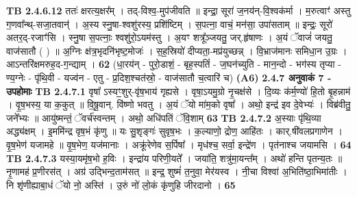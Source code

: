 \documentclass[17pt]{extarticle}
\begin{document}
                  \newline
                                \textbf{ TB 2.4.6.12} \newline
                  ततः॑ क्षरत्य॒क्षर᳚म् । तद्-विश्व॒-मुप॑जीवति ॥ इन्द्रा॒ सूरा॑ ज॒नय॑न्-वि॒श्वक॑र्मा । म॒रुत्वाꣳ॑ अस्तु ग॒णवा᳚न्थ्-सजा॒तवान्॑ । अ॒स्य स्नु॒षा-श्वशु॑रस्य॒ प्रशि॑ष्टिम् । स॒पत्ना॒ वाचं॒ मन॑सा॒ उपा॑सताम् ॥ इन्द्रः॒ सूरो॑ अतर॒द्-रजाꣳ॑सि । स्नु॒षा स॒पत्नाः॒ श्वशु॑रो॒ऽयम॑स्तु । अ॒यꣳ शत्रू᳚ञ्जयतु॒ जर्.हृ॑षाणः । अ॒यं ॅवाजं॑ जयतु॒ वाज॑सातौ ( ) ॥ अ॒ग्निः क्ष॑त्र॒भृदनि॑भृष्ट॒मोजः॑ । स॒ह॒स्रियो॑ दीप्यता॒-मप्र॑युच्छन्न् । वि॒भ्राज॑मानः समिधा॒न उ॒ग्रः । आऽन्तरि॑क्षमरुह॒द-ग॒न्द्याम् । \textbf{ 62} \newline
                  \newline
                                    (धा॒रय॑न् - पुरो॒डाशं॒ - बृह॒स्पतिं॑ - ज॒घन॑च्युति - मान॒न्दो - भग॑स्य तृप्या - ण्य॒ग्नेः - पृ॑थि॒वी - यज्व॑न - एतु - प्र॒दिश॒श्चत॑स्रो॒ - वाज॑सातौ च॒त्वारि॑ च) \textbf{(A6)} \newline \newline
                \textbf{ 2.4.7      अनुवाकं   7 - उपहोमाः} \newline
                                \textbf{ TB 2.4.7.1} \newline
                  वृषा᳚ ऽस्यꣳ॒॒शुर्-वृ॑ष॒भाय॑ गृह्यसे । वृषा॒ऽयमु॒ग्रो नृ॒चक्ष॑से । दि॒व्यः क॑र्म॒ण्यो॑ हि॒तो बृ॒हन्नाम॑ । वृ॒ष॒भस्य॒ या क॒कुत् ॥ वि॒षू॒वान्. वि॑ष्णो भवतु । अ॒यं ॅयो मा॑म॒को वृषा᳚ । अथो॒ इन्द्र॑ इव दे॒वेभ्यः॑ । विब्र॑वीतु॒ जने᳚भ्यः ॥ आयु॑ष्मन्तं॒ ॅवर्च॑स्वन्तम् । अथो॒ अधि॑पतिं ॅवि॒शाम् \textbf{ 63} \newline
                  \newline
                                \textbf{ TB 2.4.7.2} \newline
                  अ॒स्याः पृ॑थि॒व्या अद्ध्य॑क्षम् । इ॒ममि॑न्द्र वृष॒भं कृ॑णु ॥ यः सु॒शृङ्गः॑ सुवृष॒भः । क॒ल्याणो॒ द्रोण॒ आहि॑तः । कार्.षी॑वलप्रगाणेन । वृ॒ष॒भेण॑ यजामहे ॥ वृ॒ष॒भेण॒ यज॑मानाः । अक्रू॑रेणेव स॒र्पिषा᳚ । मृध॑श्च॒ सर्वा॒ इन्द्रे॑ण । पृत॑नाश्च जयामसि । \textbf{ 64} \newline
                  \newline
                                \textbf{ TB 2.4.7.3} \newline
                  यस्या॒यमृ॑ष॒भो ह॒विः । इन्द्रा॑य परिणी॒यते᳚ । जया॑ति॒ शत्रु॑मा॒यन्त᳚म् । अथो॑ हन्ति पृतन्य॒तः ॥ नृ॒णामह॑ प्र॒णीरस॑त् । अग्र॑ उद्भिन्द॒ताम॑सत् ॥ इन्द्र॒ शुष्मं॑ त॒नुवा॒ मेर॑यस्व । नी॒चा विश्वा॑ अ॒भिति॑ष्ठा॒भिमा॑तीः । नि शृ॑णीह्याबा॒धं ॅयो नो॒ अस्ति॑ । उ॒रुं नो॑ लो॒कं कृ॑णुहि जीरदानो । \textbf{ 65} \newline
\end{document}
